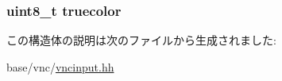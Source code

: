 \label{structVncInput_1_1PixelFormat_ae651b46b775055134b81e5055203facf}
\hypertarget{structVncInput_1_1PixelFormat_ab14b7ec53c8b8d397a4abb2c61f3dde6}{
\subsubsection[{truecolor}]{\setlength{\rightskip}{0pt plus 5cm}uint8\_\-t {\bf truecolor}}}
\label{structVncInput_1_1PixelFormat_ab14b7ec53c8b8d397a4abb2c61f3dde6}


この構造体の説明は次のファイルから生成されました:\begin{DoxyCompactItemize}
\item 
base/vnc/\hyperlink{vncinput_8hh}{vncinput.hh}\end{DoxyCompactItemize}
